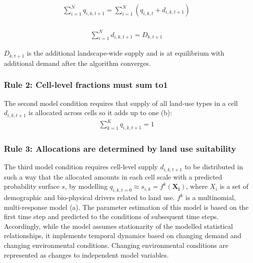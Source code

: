 \documentclass[titlesmallcaps,copyrightpage]{uomthesis}\usepackage[]{graphicx}\usepackage[]{color}
\begin{document}
\begin{equation}
 \begin{aligned}
\sum_{i=1}^N q_{i,k,t+1} = \sum_{i=1}^N (q_{i,k,t} + d_{i,k,t+1})\\
\end{aligned}
\end{equation}

\begin{equation}
 \begin{aligned}
\sum_{i=1}^N d_{i,k,t+1} = D_{k,t+1}
\end{aligned}
\end{equation}

\(D_{k,t+1}\) is the additional landscape-wide supply and is at
equilibrium with additional demand after the algorithm converges.

\subsubsection{Rule 2: Cell-level fractions must sum to1}

The second model condition requires that supply of all land-use types in
a cell \(d_{i,k,t+1}\) is allocated across cells so it adds up to one (b):
\begin{equation}
\begin{aligned}
\sum_{k=1}^K q_{i,k,t+1} = 1
\end{aligned}
\end{equation}

\subsubsection{Rule 3: Allocations are determined by land use
suitability}

The third model condition requires cell-level supply \(d_{i,k,t+1}\) to
be distributed in such a way that the allocated amounts in each cell
scale with a predicted probability surface \(s\), by modelling
\(q_{i,k,t=0} \approx s_{i,k}=f^k(\mathbf{X_i})\), where \(X_i\) is a
set of demographic and bio-physical drivers related to land use. \(f^k\)
is a multinomial, multi-response model (a). The
parameter estimation of this model is based on the first time step and
predicted to the conditions of subsequent time steps. Accordingly, while
the model assumes stationarity of the modelled statistical
relationships, it implements temporal dynamics based on changing demand
and changing environmental conditions. Changing environmental conditions
are represented as changes to independent model variables.
\end{document}
